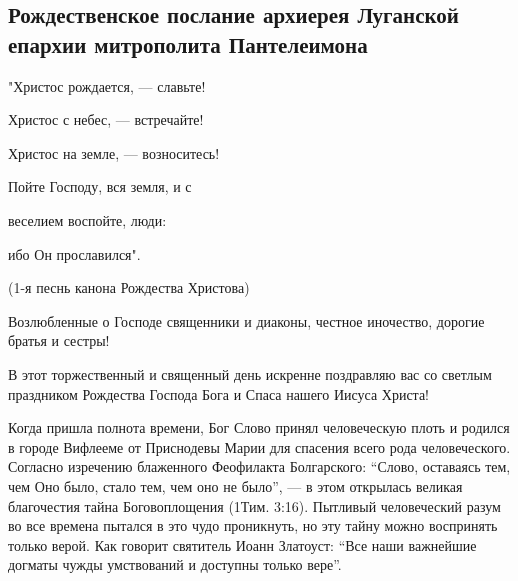  
 
 
 
 
\subsection{Рождественское послание архиерея Луганской епархии митрополита Пантелеимона}
\label{sec:06_01_2022.stz.news.lnr.lug_info.3.poslanie_rozhdestvo}


"Христос рождается, — славьте!

Христос с небес, — встречайте!

Христос на земле, — возноситесь!

Пойте Господу, вся земля, и с

веселием воспойте, люди:

ибо Он прославился".

(1-я песнь канона Рождества Христова)

Возлюбленные о Господе священники и диаконы, честное иночество, дорогие братья
и сестры!

В этот торжественный и священный день искренне поздравляю вас со светлым
праздником Рождества Господа Бога и Спаса нашего Иисуса Христа!


Когда пришла полнота времени, Бог Слово принял человеческую плоть и родился в
городе Вифлееме от Приснодевы Марии для спасения всего рода человеческого.
Согласно изречению блаженного Феофилакта Болгарского: \enquote{Слово, оставаясь тем,
чем Оно было, стало тем, чем оно не было}, — в этом открылась великая
благочестия тайна Боговоплощения (1Тим. 3:16). Пытливый человеческий разум во
все времена пытался в это чудо проникнуть, но эту тайну можно воспринять только
верой. Как говорит святитель Иоанн Златоуст: \enquote{Все наши важнейшие догматы чужды
умствований и доступны только вере}.

